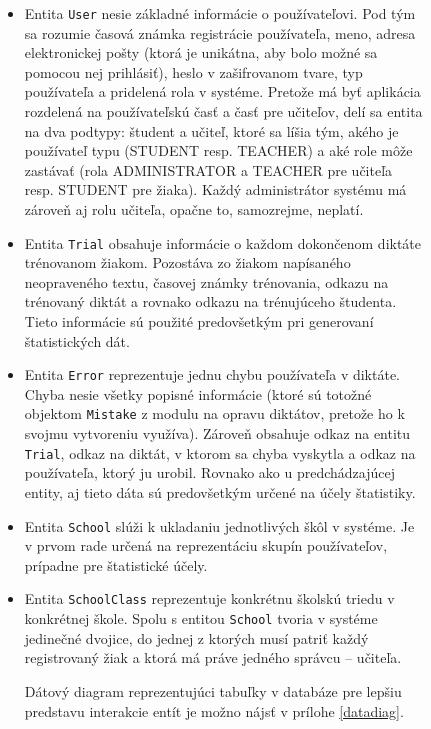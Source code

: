 \documentclass[12pt,oneside]{fithesis2}
\begin{document}
\begin{figure}
\begin{itemize}
	\item Entita \texttt{User} nesie základné informácie o používateľovi. Pod tým sa rozumie časová známka registrácie používateľa, meno, adresa elektronickej pošty (ktorá je unikátna, aby bolo možné sa pomocou nej prihlásiť), heslo v zašifrovanom tvare, typ používateľa a pridelená rola v systéme. Pretože má byť aplikácia rozdelená na používateľskú časť a časť pre učiteľov, delí sa entita na dva podtypy: študent a učiteľ, ktoré sa líšia tým, akého je používateľ typu (STUDENT resp. TEACHER) a aké role môže zastávať (rola ADMINISTRATOR a TEACHER pre učiteľa resp. STUDENT pre žiaka). Každý administrátor systému má zároveň aj rolu učiteľa, opačne to, samozrejme, neplatí.
	\item Entita \texttt{Trial} obsahuje informácie o každom dokončenom diktáte trénovanom žiakom. Pozostáva zo žiakom napísaného neopraveného textu, časovej známky trénovania, odkazu na trénovaný diktát a rovnako odkazu na trénujúceho študenta. Tieto informácie sú použité predovšetkým pri generovaní štatistických dát.
	\item Entita \texttt{Error} reprezentuje jednu chybu používateľa v diktáte. Chyba nesie všetky popisné informácie (ktoré sú totožné objektom \texttt{Mistake} z modulu na opravu diktátov, pretože ho k svojmu vytvoreniu využíva). Zároveň obsahuje odkaz na entitu \texttt{Trial}, odkaz na diktát, v ktorom sa chyba vyskytla a odkaz na používateľa, ktorý ju urobil. Rovnako ako u predchádzajúcej entity, aj tieto dáta sú predovšetkým určené na účely štatistiky. 
	\item Entita \texttt{School} slúži k ukladaniu jednotlivých škôl v systéme. Je v prvom rade určená na reprezentáciu skupín používateľov, prípadne pre štatistické účely.
	\item Entita \texttt{SchoolClass} reprezentuje konkrétnu školskú triedu v konkrétnej škole. Spolu s entitou \texttt{School} tvoria v systéme jedinečné dvojice, do jednej z ktorých musí patriť každý registrovaný žiak a ktorá má práve jedného správcu -- učiteľa. 
	\par Dátový diagram reprezentujúci tabuľky v databáze pre lepšiu predstavu interakcie entít je možno nájsť v prílohe \ref{datadiag}.
		\end{itemize}	
\end{figure}
		
\end{document}
